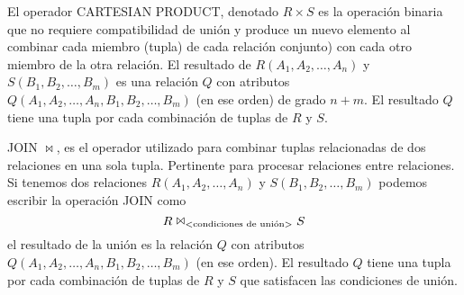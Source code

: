 El operador CARTESIAN PRODUCT, denotado $R \times S$ es la operación binaria que no requiere compatibilidad de unión y produce un nuevo elemento al combinar cada miembro (tupla) de cada relación conjunto) con cada otro miembro de la otra relación. El resultado de $R(A_1,A_2,\ldots,A_n)$ y $S(B_1,B_2,\ldots,B_m)$ es una relación $Q$ con atributos $Q(A_1,A_2,\ldots,A_n,B_1,B_2,\ldots,B_m)$ (en ese orden) de grado $n+m$. El resultado $Q$ tiene una tupla por cada combinación de tuplas de $R$ y $S$.

JOIN $\Join$, es el operador utilizado para combinar tuplas relacionadas de dos relaciones en una sola tupla. Pertinente para procesar relaciones entre relaciones. Si tenemos dos relaciones $R(A_1,A_2,\ldots,A_n)$ y $S(B_1,B_2,\ldots,B_m)$ podemos escribir la operación JOIN como
\begin{equation}
R\Join_\text{\textless condiciones de unión\textgreater}S
\end{equation}
el resultado de la unión es la relación $Q$ con atributos $Q(A_1,A_2,\ldots,A_n,B_1,B_2,\ldots,B_m)$ (en ese orden). El resultado $Q$ tiene una tupla por cada combinación de tuplas de $R$ y $S$ que satisfacen las condiciones de unión.